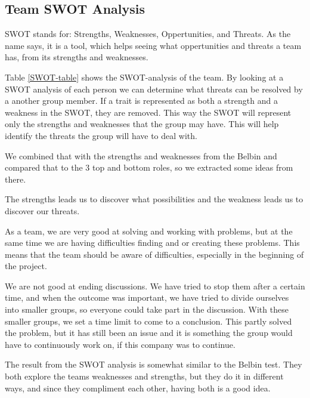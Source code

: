 \subsection{Team SWOT Analysis} 
SWOT stands for: Strengths, Weaknesses, Oppertunities, and Threats. As the name says, it is a tool, which helps seeing what oppertunities and threats a team has, from its strengths and weaknesses. 
 
Table \ref{SWOT-table} shows the SWOT-analysis of the team. 
By looking at a SWOT analysis of each person we can determine what threats can be resolved by a another group member.
If a trait is represented as both a strength and a weakness in the SWOT, they are removed. This way the SWOT will represent only the strengths and weaknesses that the group may have. This will help identify the threats the group will have to deal with.

We combined that with the strengths and weaknesses from the Belbin and compared that to the 3 top and bottom roles, so we extracted some ideas from there.

The strengths leads us to discover what possibilities and the weakness leads us to discover our threats. 

As a team, we are very good at solving and working with problems, but at the same time we are having difficulties finding and or creating these problems. 
This means that the team should be aware of difficulties, especially in the beginning of the project.


We are not good at ending discussions. We have tried to stop them after a certain time, and when the outcome was important, we have tried to divide ourselves into smaller groups, so everyone could take part in the discussion. With these smaller groups, we set a time limit to come to a conclusion. This partly solved the problem, but it has still been an issue and it is something the group would have to continuously work on, if this company was to continue. 


The result from the SWOT analysis is somewhat similar to the Belbin test. They both explore the teams weaknesses and strengths, but they do it in different ways, and since they compliment each other, having both is a good idea.

